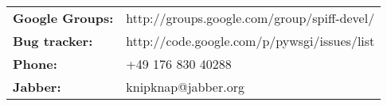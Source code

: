 \begin{tabular}{ll}
{\bf Google Groups:} & http://groups.google.com/group/spiff-devel/ \\
{\bf Bug tracker:}   & http://code.google.com/p/pywsgi/issues/list \\
{\bf Phone:}         & +49 176 830 40288 \\
{\bf Jabber:}        & knipknap@jabber.org
\end{tabular}
